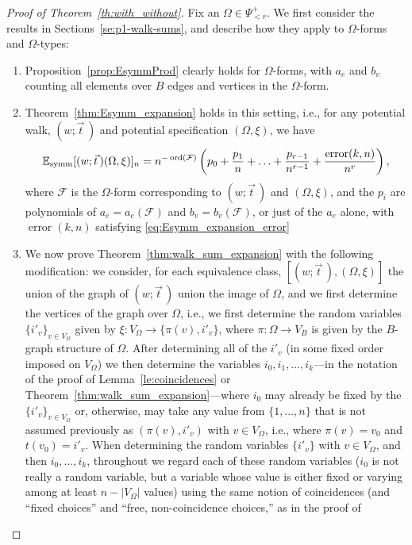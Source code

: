 \documentclass{memo-l}
\newcommand{\nonsigma}{\xi}
\theoremstyle{plain}
\theoremstyle{definition}
\numberwithin{section}{chapter}
\numberwithin{equation}{chapter}
\DeclareMathOperator{\ord}{ord}
\DeclareMathOperator{\error}{error}
\newcommand{\from}{\colon}
\newcommand{\potwalk}{(w;\vec t\,)}
\theoremstyle{plain}
\theoremstyle{definition}
\newcommand\EE{\mathbb{E}}
\newcommand\cF{\mathcal{F}}
\begin{document}
\begin{proof}[Proof of Theorem~\ref{th:with_without}]
Fix an $\Omega\in\Psi^+_{<r}$.
We first consider the results in Sections~\ref{se:p1-walk-sums}, and
describe how they apply to
$\Omega$-forms and $\Omega$-types:
\begin{enumerate}
\item Proposition~\ref{prop:EsymmProd} clearly holds for $\Omega$-forms, with
$a_e$ and $b_v$ counting all elements over $B$ edges and vertices in
the $\Omega$-form.
\item Theorem~\ref{thm:Esymm_expansion} holds in this setting, i.e.,
for any potential walk, $\potwalk$ and potential specification
$(\Omega,\nonsigma)$, we have
\begin{equation}
\EE_{\rm{symm}}[\potwalk(\Omega,\nonsigma)]_n =
n^{-\ord(\cF)} \left( p_0 + \frac{p_1}{n} + \ldots +
\frac{p_{r-1}}{n^{r-1}} + \frac{\error(k,n)}{n^r} \right)  ,
\end{equation}
where $\cF$ is the $\Omega$-form corresponding to
$\potwalk$ and $(\Omega,\nonsigma)$,
and the $p_i$ are polynomials of $a_e=a_e(\cF)$
and $b_v=b_v(\cF)$, or just of the $a_e$ alone, with
$\error(k,n)$ satisfying
\eqref{eq:Esymm_expansion_error}
\item We now prove Theorem~\ref{thm:walk_sum_expansion} with the
following modification: we consider, for each
equivalence class, $[(w;\vec t\,),(\Omega,\nonsigma)]$ the union of
the graph of $(w;\vec t\,)$ union the image of $\Omega$, and we
first determine the vertices of the graph over $\Omega$,
i.e., we first determine the random variables $\{i'_v\}_{v\in V_\Omega}$
given by $\nonsigma\from V_\Omega\to \{\pi(v),i'_v\}$, where
$\pi\from\Omega\to V_B$ is given by the $B$-graph structure of $\Omega$.
After determining all of the $i'_v$ (in some fixed order imposed on
$V_\Omega$) we then determine the variables $i_0,i_1,\ldots,i_k$---in
the notation of the proof of Lemma~\ref{le:coincidences}
or Theorem~\ref{thm:walk_sum_expansion}---where $i_0$ may already be
fixed by the $\{i'_v\}_{v\in V_\Omega}$ or, otherwise, may take
any value from $\{1,\ldots,n\}$ that is not assumed previously
as $(\pi(v),i'_v)$ with $v\in V_\Omega$, i.e., where $\pi(v)=v_0$
and $t(v_0)=i'_v$.
When determining the random variables
$\{i'_v\}$ with $v\in V_\Omega$, and then
$i_0,\ldots,i_k$, throughout we regard each of these random variables
($i_0$ is not really a random variable, but a variable whose value
is either fixed or varying among at least $n-|V_\Omega|$ values) 
using the same notion of coincidences (and ``fixed choices'' and
``free, non-coincidence choices,'' as in the proof of 

\end{enumerate}
\end{proof}
\end{document}
